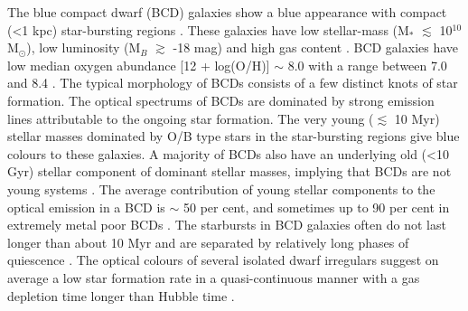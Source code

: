 \documentclass[useAMS,usenatbib]{mn2e}
\begin{document}
The blue compact dwarf (BCD) galaxies show a blue appearance with compact (\textless 1 kpc) star-bursting regions \citep{1965ApJ...142.1293Z,1981ApJ...247..823T}. These galaxies have low stellar-mass (M$_{*}$ $\lesssim$ 10$^{10}$ M$_{\odot}$), low luminosity (M$_{B}$ $\gtrsim$ -18 mag) and high gas content \citep[M$_{HI}$ $\gtrsim$ 10$^{8}$ M$_{\odot}$;][]{2013ApJ...764...44Z}. BCD galaxies have low median oxygen abundance [12 + log(O/H)] $\sim$ 8.0 with a range between 7.0 and 8.4 \citep{1972ApJ...173...25S,1999ApJ...527..757I,2000A&ARv..10....1K,2004ApJS..153..429K,2008A&A...491..113P}. The typical morphology of BCDs consists of a few distinct knots of star formation. The optical spectrums of BCDs are dominated by strong emission lines attributable to the ongoing star formation. The very young ($\lesssim$ 10 Myr) stellar masses dominated by O/B type stars in the star-bursting regions give blue colours to these galaxies. A majority of BCDs also have an underlying old (\textless 10 Gyr) stellar component of dominant stellar masses, implying that BCDs are not young systems \citep{2011AJ....141...68Z}. The average contribution of young stellar components to the optical emission in a BCD is $\sim$ 50 per cent, and sometimes up to 90 per cent in extremely metal poor BCDs \citep{1999AGM....15.P102N,2001ApJS..136..393C,2009A&A...501...75A}. The starbursts in BCD galaxies often do not last longer than about 10 Myr and are separated by relatively long phases of quiescence \citep{1991ApJ...370...25T,1995A&A...303...41K,1999A&A...349..765M,2000ApJ...539..641T}. The optical colours of several isolated dwarf irregulars suggest on average a low star formation rate in a quasi-continuous manner with a gas depletion time longer than Hubble time \citep{2001AJ....121.2003V}. 
\end{document}
